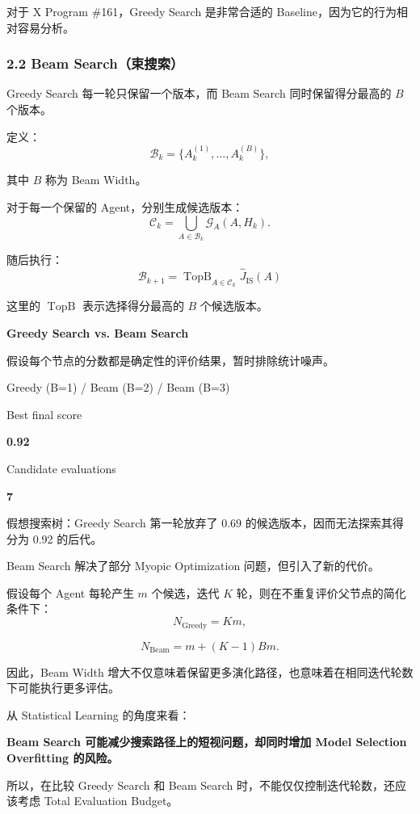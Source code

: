 对于 X Program \#161，Greedy Search 是非常合适的 Baseline，因为它的行为相对容易分析。

\hypertarget{part-3-40-0001-beam-searchux675fux641cux7d22}{%
\subsubsection{2.2 Beam Search（束搜索）}\label{part-3-40-0001-beam-searchux675fux641cux7d22}}

Greedy Search 每一轮只保留一个版本，而 Beam Search 同时保留得分最高的 \(B\) 个版本。

定义：
\[\mathcal B_k
=
\{A_k^{(1)},\ldots,A_k^{(B)}\},\]

其中 \(B\) 称为 Beam Width。

对于每一个保留的 Agent，分别生成候选版本：
\[\mathcal C_k
=
\bigcup_{A\in\mathcal B_k}
\mathcal G_A(A,H_k).\]

随后执行：
\[\boxed{
\mathcal B_{k+1}
=
\operatorname{TopB}_{A\in\mathcal C_k}
\widehat J_{\mathrm{IS}}(A)
}\]

这里的 \(\operatorname{TopB}\) 表示选择得分最高的 \(B\) 个候选版本。

\textbf{Greedy Search vs. Beam Search}

假设每个节点的分数都是确定性的评价结果，暂时排除统计噪声。

Greedy (B=1) / Beam (B=2) / Beam (B=3)


Best final score

\textbf{0.92}

Candidate evaluations

\textbf{7}

假想搜索树：Greedy Search 第一轮放弃了 0.69 的候选版本，因而无法探索其得分为 0.92 的后代。

Beam Search 解决了部分 Myopic Optimization 问题，但引入了新的代价。

假设每个 Agent 每轮产生 \(m\) 个候选，迭代 \(K\) 轮，则在不重复评价父节点的简化条件下：
\[N_{\mathrm{Greedy}}=Km,\]

\[N_{\mathrm{Beam}}=m+(K-1)Bm.\]

因此，Beam Width 增大不仅意味着保留更多演化路径，也意味着在相同迭代轮数下可能执行更多评估。

从 Statistical Learning 的角度来看：

\textbf{Beam Search 可能减少搜索路径上的短视问题，却同时增加 Model Selection Overfitting 的风险。}

所以，在比较 Greedy Search 和 Beam Search 时，不能仅仅控制迭代轮数，还应该考虑 Total Evaluation Budget。

